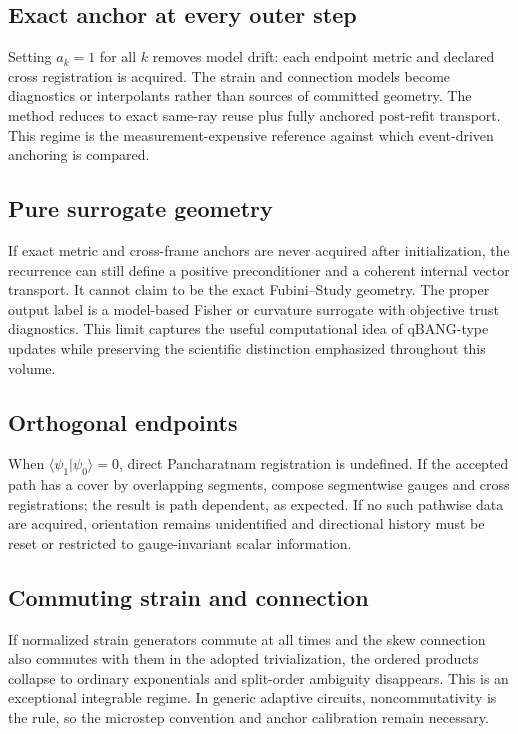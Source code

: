 \documentclass[10pt,twocolumn]{article}
\theoremstyle{definition}
\theoremstyle{remark}
\begin{document}
\subsection{Exact anchor at every outer step}

Setting $a_k=1$ for all $k$ removes model drift: each endpoint metric and
declared cross registration is acquired.  The strain and connection models
become diagnostics or interpolants rather than sources of committed geometry.
The method reduces to exact same-ray reuse plus fully anchored post-refit
transport.  This regime is the measurement-expensive reference against which
event-driven anchoring is compared.

\subsection{Pure surrogate geometry}

If exact metric and cross-frame anchors are never acquired after
initialization, the recurrence can still define a positive preconditioner and
a coherent internal vector transport.  It cannot claim to be the exact
Fubini--Study geometry.  The proper output label is a model-based Fisher or
curvature surrogate with objective trust diagnostics.  This limit captures
the useful computational idea of qBANG-type updates while preserving the
scientific distinction emphasized throughout this volume.

\subsection{Orthogonal endpoints}

When $\langle\psi_1|\psi_0\rangle=0$, direct Pancharatnam registration is
undefined.  If the accepted path has a cover by overlapping segments, compose
segmentwise gauges and cross registrations; the result is path dependent, as
expected.  If no such pathwise data are acquired, orientation remains
unidentified and directional history must be reset or restricted to
gauge-invariant scalar information.

\subsection{Commuting strain and connection}

If normalized strain generators commute at all times and the skew connection
also commutes with them in the adopted trivialization, the ordered products
collapse to ordinary exponentials and split-order ambiguity disappears.  This
is an exceptional integrable regime.  In generic adaptive circuits,
noncommutativity is the rule, so the microstep convention and anchor
calibration remain necessary.
\end{document}
